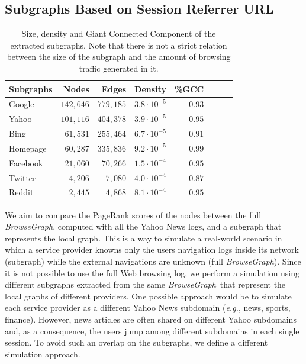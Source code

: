 \documentclass{sig-alternate-2013}
\newcommand{\eg}{\emph{e.g.}}
\newcommand{\bgraph}{\textit{BrowseGraph}}
\begin{document}
\subsection{Subgraphs Based on Session Referrer URL} \label{sec:subgraphs}
% 
\begin{table}[!ht]
\centering
  \setlength{\tabcolsep}{.7em}
  \begin{tabular}{@{}lrrrrrrr@{}} \toprule
    \textbf{Subgraphs} & \textbf{Nodes} & \textbf{Edges} & \textbf{Density} & \textbf{\%GCC} \\
    \midrule
    Google       & $142,646$    & $779,185$ & $3.8\cdot10^{-5}$ & $0.93$ \\
    Yahoo       & $101,116$   & $404,378$ & $3.9\cdot10^{-5}$ & $0.95$ \\
    Bing         & $61,531$   & $255,464$ & $6.7\cdot10^{-5}$ & $0.91$ \\
    Homepage    & $60,287$    & $335,836$ & $9.2\cdot10^{-5}$ & $0.99$ \\
    Facebook     & $21,060$     & $70,266$  & $1.5\cdot10^{-4}$ & $0.95$ \\
    Twitter         & $4,206$     & $7,080$   & $4.0\cdot10^{-4}$ & $0.87$ \\
    Reddit       & $2,445$      & $4,868$   & $8.1\cdot10^{-4}$ & $0.95$ \\
    \bottomrule
  \end{tabular}
  \caption{Size, density and Giant Connected Component of the extracted subgraphs. Note that there is not a strict relation between the size of the subgraph and the amount of browsing traffic generated in it.}
  \label{tab:infosubgraphs}
\end{table}
% 
We aim to compare the PageRank scores of the nodes between the full \bgraph, computed with all the Yahoo News logs, and a subgraph that represents the local graph. This is a way to simulate a real-world scenario in which a service provider knowns only the users navigation logs inside its network (subgraph) while the external navigations are unknown (full \bgraph). 
Since it is not possible to use the full Web browsing log, we perform a simulation using different subgraphs extracted from the same \bgraph\ that represent the local graphs of different providers.
% 
One possible approach would be to simulate each service provider as a different Yahoo News subdomain (\eg, news, sports, finance). However, news articles are often shared on different Yahoo subdomains and, as a consequence, the users jump among different subdomains in each single session. To avoid such an overlap on the subgraphs, we define a different simulation approach.
\end{document}
